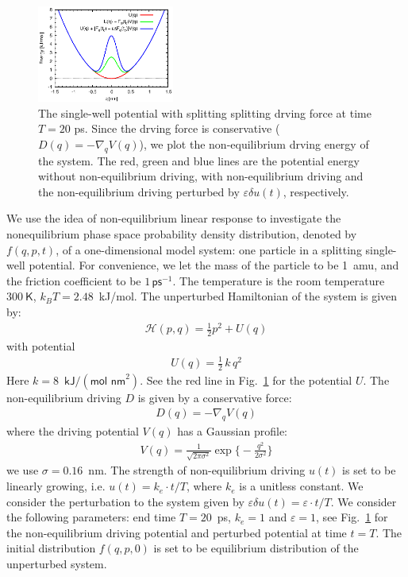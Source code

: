 \documentclass[aip,jcp,a4paper,reprint,onecolumn]{revtex4-1}
\newcommand{\mh}{\mathcal H}
\newcommand{\eps}{\varepsilon}
\begin{document}
\begin{figure}
  \centering
  \includegraphics[width=0.4\textwidth]{figs/fig-split-pot.eps}
  \caption{The single-well potential with splitting splitting drving
    force at time $T = 20$ ps.  Since the drving force is
    conservative ($ D( q) = -\nabla_{q}V( q)$),
    we plot the non-equilibrium drving energy of the system.  The red,
    green and blue lines are the potential energy without
    non-equilibrium driving, with non-equilibrium driving and
    the non-equilibrium driving perturbed by $\eps\delta u(t)$,
    respectively.  }
  \label{fig:tmp4}
\end{figure}

We use the idea of non-equilibrium linear response to investigate the
nonequilibrium phase space probability density distribution, denoted by $f(q, p, t)$, of a one-dimensional model system: one particle in a
splitting single-well potential.  For convenience, we let the mass of
the particle to be 1~\textsf{amu}, and the friction coefficient to be
$1\,\textsf{ps}^{-1}$.
The temperature is the
room temperature $300\ \textsf{K}$, $k_BT = 2.48$~\textsf{kJ/mol}.
The unperturbed Hamiltonian of the system is
given by:
\begin{align}
  \mh ( p,  q) = \frac 12  p^2 + U( q) 
\end{align}
with potential
\begin{align}
  U( q) = \frac12\,k\, q^2 
\end{align}
Here $k = 8$~$\textsf{kJ} / (\textsf{mol nm}^2)$.
See the red line in Fig.~\ref{fig:tmp4} for the  potential $U$.
The non-equilibrium driving $ D$ is given by a conservative force:
\begin{align}
   D( q) = -\nabla_{ q} V( q) 
\end{align}
where the driving potential $V( q)$ has a Gaussian profile:
\begin{align}
  V( q) = \frac{1}{\sqrt{2\pi \sigma^2}}
  \exp\Big\{-\frac{ q^2}{2\sigma^2}\Big\}
\end{align}
we use $\sigma = 0.16$~\textsf{nm}.  The strength of non-equilibrium
driving $u(t)$ is set to be linearly growing, i.e. $ u(t) = k_e\cdot t/T$,
where $k_e$ is a unitless constant.
We
consider the perturbation to the system given by $\eps\delta u(t) = \eps \cdot t/T$.
We consider the following parameters: end time $T = 20$~\textsf{ps}, 
$k_e = 1$ and $\eps = 1$, see Fig.~\ref{fig:tmp4}
for the non-equilibrium driving potential and perturbed
potential at time $t = T$. The initial distribution $f(q, p, 0)$ is set to
be equilibrium distribution of the unperturbed system.
\end{document}
